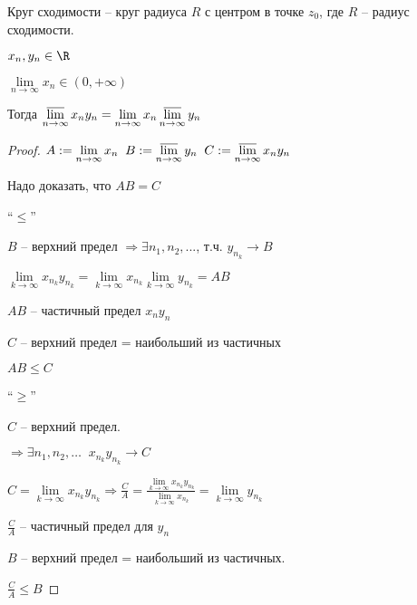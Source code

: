 \begin{definition}\slashns
    
    Круг сходимости -- круг радиуса $R$ с центром в точке $z_0$, где $R$ -- радиус сходимости.
\end{definition}

\begin{lemma}\slashns
    
    $x_n, y_n \in \R$
    
    $\lim\limits_{n \to \infty} x_n \in (0, +\infty)$
    
    Тогда $\varlimsup\limits_{n \to \infty} x_n y_n = \lim\limits_{n \to \infty} x_n \varlimsup\limits_{n\to \infty} y_n$
\end{lemma}

\begin{proof}\slashns
    
    $A:= \lim\limits_{n \to \infty} x_n \;\; B:= \varlimsup\limits_{n\to\infty} y_n \;\; C:= \varlimsup\limits_{n\to\infty} x_ny_n$
    
    Надо доказать, что $AB=C$
    
    ``$\leqslant$''
    
    $B$ -- верхний предел $\Rightarrow \exists n_1,n_2,...$, т.ч. $y_{n_k} \to B$
    
    $\lim\limits_{k \to \infty} x_{n_k} y_{n_k} = \lim\limits_{k \to \infty} x_{n_k} \lim\limits_{k \to \infty} y_{n_k} = AB$
    
    $AB$ -- частичный предел $x_ny_n$
    
    $C$ -- верхний предел = наибольший из частичных
    
    $AB \leqslant C$
    
    ``$\geqslant$''
    
    $C$ -- верхний предел.
    
    $\Rightarrow \exists n_1, n_2,\ldots \;\;x_{n_{k}} y_{n_k}\to C$
    
    $C = \lim\limits_{k \to \infty} x_{n_k} y_{n_k} \Rightarrow \frac{C}{A} = \frac{\lim\limits_{k \to \infty} x_{n_k}y_{n_k} }{\lim\limits_{k \to \infty} x_{n_k}} = \lim\limits_{k \to \infty} y_{n_k}$
    
    $\frac{C}{A}$ -- частичный предел для $y_n$
    
    $B$ -- верхний предел = наибольший из частичных.
    
    $\frac{C}{A} \leqslant B$
\end{proof}

